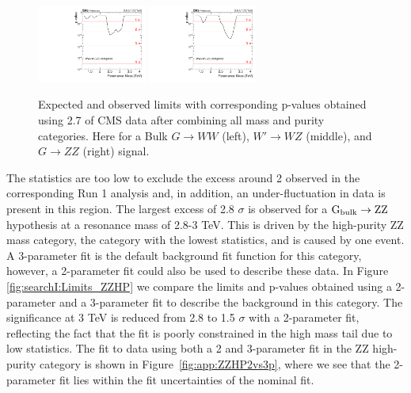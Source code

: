 \begin{figure}[h!]
\includegraphics[width=0.32\textwidth]{figures/analysis/search1/AN-15-211/pvalues/pvalue_WZin_combined_new.pdf}
\includegraphics[width=0.32\textwidth]{figures/analysis/search1/AN-15-211/pvalues/pvalue_BulkZZin_combined_new.pdf}\\
\caption{Expected and observed limits with corresponding p-values obtained using 2.7 \fbinv of CMS data after combining all mass and purity categories. Here for a Bulk $G\rightarrow WW$ (left), $W'\rightarrow WZ$ (middle), and $G\rightarrow ZZ$ (right) signal.}
\label{fig:searchI:Limits_CombNew}
\end{figure}
The statistics are too low to exclude the excess around 2 \TeV observed in the corresponding Run 1 analysis and, in addition, an under-fluctuation in data is present in this region. The largest excess of 2.8 $\sigma$ is observed for a $\mathrm{G}_\mathrm{bulk} \rightarrow \mathrm{Z}\mathrm{Z}$ hypothesis at a resonance mass of 2.8-3 TeV. This is driven by the high-purity ZZ mass category, the category with the lowest statistics, and is caused by one event. A 3-parameter fit is the default background fit function for this category, however, a 2-parameter fit could also be used to describe these data. In Figure \ref{fig:searchI:Limits_ZZHP} we compare the limits and p-values obtained using a 2-parameter and a 3-parameter fit to describe the background in this category. The significance at 3 TeV is reduced from 2.8 to 1.5 $\sigma$ with a 2-parameter fit, reflecting the fact that the fit is poorly constrained in the high mass tail due to low statistics. The fit to data using both a 2 and 3-parameter fit in the ZZ high-purity category is shown in Figure~\ref{fig:app:ZZHP2vs3p}, where we see that the 2-parameter fit lies within the fit uncertainties of the nominal fit.
